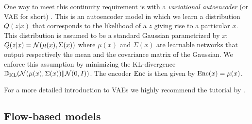 \documentclass[../main.tex]{subfiles}
\begin{document}
One way to meet this continuity requirement is with a \emph{variational autoencoder} (or VAE for short) \cite{kingmaAutoEncoding2014}.
This is an autoencoder model in which we learn a distribution $Q(z | x)$ that corresponds to the likelihood of a $z$ giving rise to a particular $x$.
This distribution is assumed to be a standard Gaussian parametrized by $x$: $Q(z | x) = \mathcal{N}(\mu(x), \Sigma(x))$ where $\mu(x)$ and $\Sigma(x)$ are learnable networks that output respectively the mean and the covariance matrix of the Gaussian.
We enforce this assumption by minimizing the KL-divergence $\mathbb{D}_\text{KL}(\mathcal{N}(\mu(x), \Sigma(x)) \| \mathcal{N}(0, I))$.
The encoder $\operatorname{Enc}$ is then given by $\operatorname{Enc}(x) = \mu(x)$.

For a more detailed introduction to VAEs we highly recommend the tutorial by \citeauthor{doerschTutorial2021} \cite{doerschTutorial2021}.

\subsection{Flow-based models}
\label{bg/nf}
\end{document}
